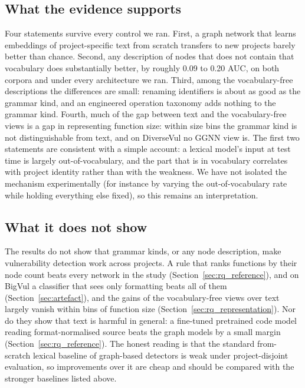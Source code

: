 \documentclass[pdflatex,sn-basic]{sn-jnl}
\theoremstyle{thmstyleone}%
\newcommand{\numdeltaMax}{0.20}
\newcommand{\numdeltaMin}{0.09}
\begin{document}
\subsection{What the evidence supports}
Four statements survive every control we ran. First, a graph network that
learns embeddings of project-specific text from scratch transfers to new
projects barely better than chance. Second, any description of nodes that does
not contain that vocabulary does substantially better, by roughly \numdeltaMin{} to \numdeltaMax{}
AUC, on both corpora and under every architecture we ran. Third, among the
vocabulary-free descriptions the differences are small: renaming identifiers is
about as good as the grammar kind, and an engineered operation taxonomy adds
nothing to the grammar kind. Fourth, much of the gap between text and the
vocabulary-free views is a gap in representing function size: within size bins
the grammar kind is not distinguishable from text, and on DiverseVul no GGNN view is.
The first two statements are consistent with a simple account: a lexical model's input at test time is largely out-of-vocabulary, and
the part that is in vocabulary correlates with project identity rather than with
the weakness. We have not isolated the mechanism experimentally (for instance
by varying the out-of-vocabulary rate while holding everything else fixed), so
this remains an interpretation.

\subsection{What it does not show}
The results do not show that grammar kinds, or any node description, make
vulnerability detection work across projects. A rule that ranks functions by
their node count beats every network in the study (Section~\ref{sec:rq_reference}),
and on BigVul a classifier that sees only formatting beats all of them
(Section~\ref{sec:artefact}),
and the gains of the vocabulary-free views over text largely vanish within
bins of function size (Section~\ref{sec:rq_representation}). Nor do they
show that text is harmful in general: a fine-tuned pretrained code model reading
format-normalised source beats the graph models by a small margin
(Section~\ref{sec:rq_reference}). The honest reading is that the
standard from-scratch lexical baseline of graph-based detectors is weak under
project-disjoint evaluation, so improvements over it are cheap and should be
compared with the stronger baselines listed above.
\end{document}
